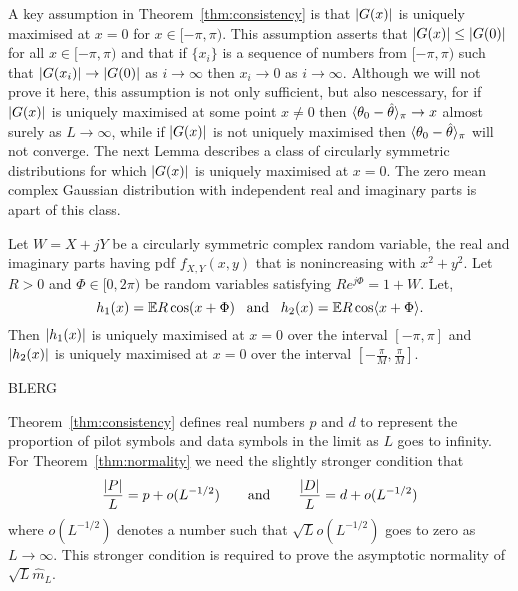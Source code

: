 \documentclass[journal]{IEEEtran}
\begin{document}
A key assumption in Theorem~\ref{thm:consistency} is that ${\left\vert G(x) \right\vert}$ is uniquely maximised at $x = 0$ for $x \in [-\pi, \pi)$.  This assumption asserts that ${\left\vert G(x) \right\vert} \leq {\left\vert G(0) \right\vert}$ for all $x \in [-\pi, \pi)$ and that if $\{x_i\}$ is a sequence of numbers from $[-\pi,\pi)$ such that ${\left\vert G(x_i) \right\vert} \rightarrow {\vert G(0) \vert}$ as $i \rightarrow \infty$ then $x_i \rightarrow 0$ as $i \rightarrow \infty$.  Although we will not prove it here, this assumption is not only sufficient, but also nescessary, for if ${\left\vert G(x) \right\vert}$ is uniquely maximised at some point $x \neq 0$ then $\langle \theta_0 - \hat{\theta} \rangle_\pi \rightarrow x$ almost surely as $L\rightarrow\infty$, while if ${\left\vert G(x) \right\vert}$ is not uniquely maximised then $\langle \theta_0 - \hat{\theta} \rangle_\pi$ will not converge.  The next Lemma describes a class of circularly symmetric distributions for which ${\left\vert G(x) \right\vert}$ is uniquely maximised at $x = 0$.  The zero mean complex Gaussian distribution with independent real and imaginary parts is apart of this class.

\begin{proposition}\label{prop:contgg2}
Let $W = X + jY$ be a circularly symmetric complex random variable, the real and imaginary parts having pdf $f_{X,Y}(x,y)$ that is nonincreasing with $x^2 + y^2$.  Let $R > 0$ and $\Phi \in [0, 2\pi)$ be random variables satisfying $R e^{j\Phi} = 1 + W$.  Let,
\[
h_1(x) = {\mathbb E} R \cos(x + \Phi) \;\;\; \text{and} \;\;\; h_2(x) =  {\mathbb E} R \cos\langle x + \Phi \rangle.
\]
Then ${\left\vert h_1(x) \right\vert}$ is uniquely maximised at $x=0$ over the interval $[-\pi,\pi]$ and ${\left\vert h_2(x) \right\vert}$ is uniquely maximised at $x = 0$ over the interval $[-\tfrac{\pi}{M},\tfrac{\pi}{M}]$.
\end{proposition}
\begin{IEEEproof}
BLERG
\end{IEEEproof}

Theorem~\ref{thm:consistency} defines real numbers $p$ and $d$ to represent the proportion of pilot symbols and data symbols in the limit as $L$ goes to infinity.  For Theorem~\ref{thm:normality} we need the slightly stronger condition that 
\[
\frac{{\left\vert P \right\vert}}{L} = p + o(L^{-1/2}) \qquad \text{and} \qquad \frac{{\left\vert D \right\vert}}{L} = d + o(L^{-1/2})
\] 
where $o(L^{-1/2})$ denotes a number such that $\sqrt{L} o(L^{-1/2})$ goes to zero as $L\rightarrow \infty$.  This stronger condition is required to prove the asymptotic normality of $\sqrt{L}\hat{m}_L$.
\end{document}
